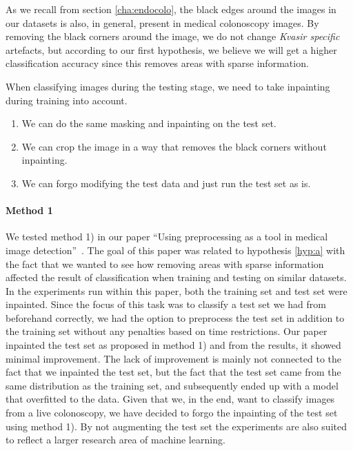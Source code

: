As we recall from section \ref{cha:endocolo}, the black edges around the images in our datasets is also, in general, present in medical colonoscopy images. By removing the black corners around the image, we do not change \textit{Kvasir specific} artefacts, but according to our first hypothesis, we believe we will get a higher classification accuracy since this removes areas with sparse information.

When classifying images during the testing stage, we need to take inpainting during training into account. 
\begin{enumerate}
\item We can do the same masking and inpainting on the test set. 
\item We can crop the image in a way that removes the black corners without inpainting.
\item We can forgo modifying the test data and just run the test set as is. 
\end{enumerate}


\paragraph{Method 1}
We tested method 1) in our paper ``Using preprocessing as a tool in medical image detection''~\cite{26254}.
The goal of this paper was related to hypothesis \ref{hyp:a} with the fact that we wanted to see how removing areas with sparse information affected the result of classification when training and testing on similar datasets. 
In the experiments run within this paper, both the training set and test set were inpainted. 
Since the focus of this task was to classify a test set we had from beforehand correctly, we had the option to preprocess the test set in addition to the training set without any penalties based on time restrictions. 
Our paper inpainted the test set as proposed in method 1) and from the results, it showed minimal improvement. The lack of improvement is mainly not connected to the fact that we inpainted the test set, but the fact that the test set came from the same distribution as the training set, and subsequently ended up with a model that overfitted to the data.
Given that we, in the end, want to classify images from a live colonoscopy, we have decided to forgo the inpainting of the test set using method 1).
By not augmenting the test set the experiments are also suited to reflect a larger research area of machine learning.



